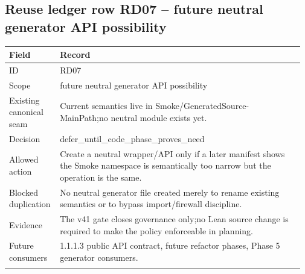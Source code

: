 \subsection*{Reuse ledger row RD07 -- future neutral generator API possibility}
\begin{longtable}{L{0.16\linewidth} L{0.81\linewidth}}
\hline
\textbf{Field} & \textbf{Record}\\
\hline
ID & RD07\\
\hline\addlinespace[0.20em]
Scope & future neutral generator API possibility\\
\hline\addlinespace[0.20em]
Existing canonical seam & Current semantics live in Smoke/\allowbreak{}GeneratedSource-MainPath;\newline no neutral module exists yet.\\
\hline\addlinespace[0.20em]
Decision & defer\_until\_code\_phase\_proves\_need\\
\hline\addlinespace[0.20em]
Allowed action & Create a neutral wrapper/\allowbreak{}API only if a later manifest shows the Smoke namespace is semantically too narrow but the operation is the same.\\
\hline\addlinespace[0.20em]
Blocked duplication & No neutral generator file created merely to rename existing semantics or to bypass import/\allowbreak{}firewall discipline.\\
\hline\addlinespace[0.20em]
Evidence & The v41 gate closes governance only;\newline no Lean source change is required to make the policy enforceable in planning.\\
\hline\addlinespace[0.20em]
Future consumers & 1.1.1.3 public API contract, future refactor phases, Phase 5 generator consumers.\\
\hline\addlinespace[0.20em]
\end{longtable}
